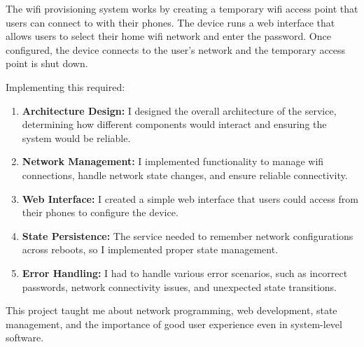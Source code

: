 \documentclass[12pt,a4paper]{report}
\begin{document}
\vspace{0.3cm}

The wifi provisioning system works by creating a temporary wifi access point that users can connect to with their phones. The device runs a web interface that allows users to select their home wifi network and enter the password. Once configured, the device connects to the user's network and the temporary access point is shut down.

\vspace{0.3cm}

Implementing this required:

\begin{enumerate}[itemsep=0.3cm]
    \item \textbf{Architecture Design:} I designed the overall architecture of the service, determining how different components would interact and ensuring the system would be reliable.

    \item \textbf{Network Management:} I implemented functionality to manage wifi connections, handle network state changes, and ensure reliable connectivity.

    \item \textbf{Web Interface:} I created a simple web interface that users could access from their phones to configure the device.

    \item \textbf{State Persistence:} The service needed to remember network configurations across reboots, so I implemented proper state management.

    \item \textbf{Error Handling:} I had to handle various error scenarios, such as incorrect passwords, network connectivity issues, and unexpected state transitions.
\end{enumerate}

\vspace{0.3cm}

This project taught me about network programming, web development, state management, and the importance of good user experience even in system-level software.
\end{document}
